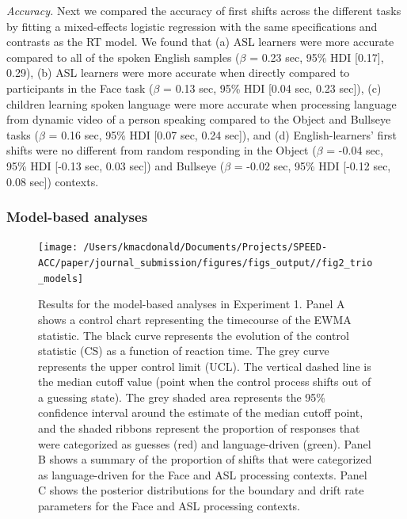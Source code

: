 \documentclass[english,floatsintext,man]{apa6}
\begin{document}
\emph{Accuracy.} Next we compared the accuracy of first shifts across
the different tasks by fitting a mixed-effects logistic regression with
the same specifications and contrasts as the RT model. We found that (a)
ASL learners were more accurate compared to all of the spoken English
samples (\(\beta\) = 0.23 sec, 95\% HDI {[}0.17{]}, 0.29), (b) ASL
learners were more accurate when directly compared to participants in
the Face task (\(\beta\) = 0.13 sec, 95\% HDI {[}0.04 sec, 0.23 sec{]}),
(c) children learning spoken language were more accurate when processing
language from dynamic video of a person speaking compared to the Object
and Bullseye tasks (\(\beta\) = 0.16 sec, 95\% HDI {[}0.07 sec, 0.24
sec{]}), and (d) English-learners' first shifts were no different from
random responding in the Object (\(\beta\) = -0.04 sec, 95\% HDI
{[}-0.13 sec, 0.03 sec{]}) and Bullseye (\(\beta\) = -0.02 sec, 95\% HDI
{[}-0.12 sec, 0.08 sec{]}) contexts.

\hypertarget{model-based-analyses}{%
\subsubsection{Model-based analyses}\label{model-based-analyses}}

\begin{figure}[!ht]

{\centering \texttt{[image: /Users/kmacdonald/Documents/Projects/SPEED-ACC/paper/journal\_submission/figures/figs\_output//fig2\_trio\_models]} 

}

\caption{Results for the model-based analyses in Experiment 1. Panel A shows a control chart representing the timecourse of the EWMA statistic. The black curve represents the evolution of the control statistic (CS) as a function of reaction time. The grey curve represents the upper control limit (UCL). The vertical dashed line is the median cutoff value (point when the control process shifts out of a guessing state). The grey shaded area represents the 95\% confidence interval around the estimate of the median cutoff point, and the shaded ribbons represent the proportion of responses that were categorized as guesses (red) and language-driven (green). Panel B shows a summary of the proportion of shifts that were categorized as language-driven for the Face and ASL processing contexts. Panel C shows the posterior distributions for the boundary and drift rate parameters for the Face and ASL processing contexts.}\label{fig:trio-model-plot}
\end{figure}
\end{document}
